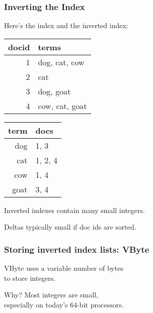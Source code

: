 \begin{frame}
\frametitle{Inverting the Index}


Here's the index and the inverted index:
\begin{center}
\begin{tabular}{r|l}
docid & terms \\ \hline
1 & dog, cat, cow\\
2 & cat\\
3 & dog, goat\\
4 & cow, cat, goat\\
\end{tabular} \hspace*{2em}
\begin{tabular}{r|l}
term & docs \\ \hline
dog & 1, 3 \\
cat & 1, 2, 4 \\
cow & 1, 4 \\
goat & 3, 4
\end{tabular}
\end{center}

Inverted indexes contain many small integers.

Deltas typically small if doc ids are sorted.


\end{frame}


\begin{frame}
\frametitle{Storing inverted index lists: VByte}


\vspace*{-2em}
VByte uses a variable number of bytes\\
to store integers.  

Why? Most integers are
small,\\
especially on today's 64-bit processors.

\end{frame}


